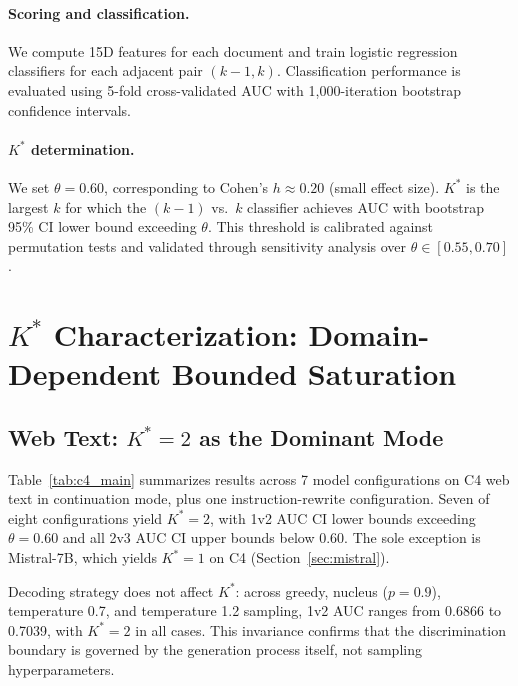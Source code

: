 \documentclass[11pt,a4paper]{article}
\begin{document}
\paragraph{Scoring and classification.} We compute 15D features for each document and train logistic regression classifiers for each adjacent pair $(k\!-\!1, k)$. Classification performance is evaluated using 5-fold cross-validated AUC with 1{,}000-iteration bootstrap confidence intervals.

\paragraph{$K^*$ determination.} We set $\theta = 0.60$, corresponding to Cohen's $h \approx 0.20$ (small effect size). $K^*$ is the largest $k$ for which the $(k\!-\!1)$ vs.\ $k$ classifier achieves AUC with bootstrap 95\% CI lower bound exceeding $\theta$. This threshold is calibrated against permutation tests and validated through sensitivity analysis over $\theta \in [0.55, 0.70]$.


\section{$K^*$ Characterization: Domain-Dependent Bounded Saturation}
\label{sec:characterization}

\subsection{Web Text: $K^*\!=\!2$ as the Dominant Mode}
\label{sec:webtext}

Table~\ref{tab:c4_main} summarizes results across 7 model configurations on C4 web text in continuation mode, plus one instruction-rewrite configuration. Seven of eight configurations yield $K^*\!=\!2$, with 1v2 AUC CI lower bounds exceeding $\theta\!=\!0.60$ and all 2v3 AUC CI upper bounds below 0.60. The sole exception is Mistral-7B, which yields $K^*\!=\!1$ on C4 (Section~\ref{sec:mistral}).

Decoding strategy does not affect $K^*$: across greedy, nucleus ($p\!=\!0.9$), temperature 0.7, and temperature 1.2 sampling, 1v2 AUC ranges from 0.6866 to 0.7039, with $K^*\!=\!2$ in all cases. This invariance confirms that the discrimination boundary is governed by the generation process itself, not sampling hyperparameters.
\end{document}
